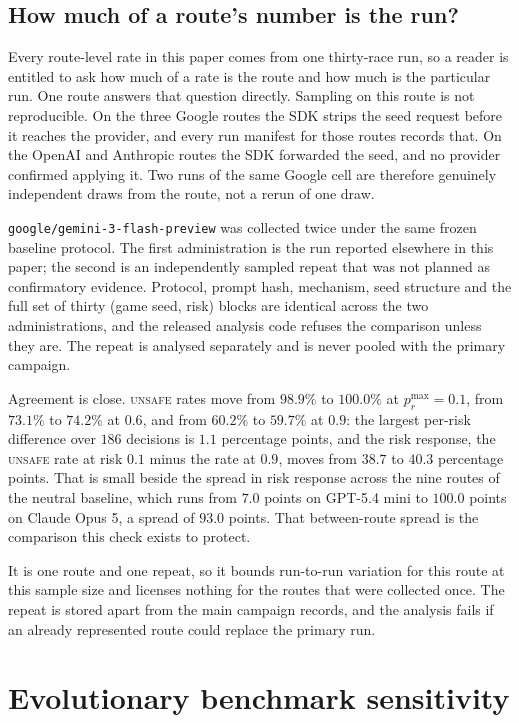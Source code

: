 \documentclass[sigconf,anonymous]{aamas}
\newcommand{\Unsafe}{\textsc{unsafe}}
\begin{document}
\subsection{How much of a route's number is the run?}
\label{app:baseline-replication}

Every route-level rate in this paper comes from one thirty-race run, so a
reader is entitled to ask how much of a rate is the route and how much is the
particular run. One route answers that question directly. Sampling on this
route is not reproducible. On the three Google routes the SDK strips the seed
request before it reaches the provider, and every run manifest for those
routes records that. On the OpenAI and Anthropic routes the SDK forwarded the
seed, and no provider confirmed applying it. Two runs of the same Google cell
are therefore genuinely independent draws from the route, not a rerun of one
draw.

\texttt{google/gemini-3-flash-preview} was collected twice under the same
frozen baseline protocol. The first administration is the run reported
elsewhere in this paper; the second is an independently sampled repeat that was
not planned as confirmatory evidence. Protocol, prompt hash, mechanism, seed
structure and the full set of thirty (game seed, risk) blocks are identical
across the two administrations, and the released analysis code refuses the
comparison unless they are. The repeat is analysed separately and is never
pooled with the primary campaign.

Agreement is close. \Unsafe{} rates move from $98.9\%$ to $100.0\%$ at
$p_r^{\max}=0.1$, from $73.1\%$ to $74.2\%$ at $0.6$, and from $60.2\%$ to
$59.7\%$ at $0.9$: the largest per-risk difference over $186$ decisions is
$1.1$ percentage points, and the risk response, the \Unsafe{} rate at risk
$0.1$ minus the rate at $0.9$, moves from $38.7$ to $40.3$ percentage points.
That is small beside the spread in risk response across the nine routes of the
neutral baseline, which runs from $7.0$ points on GPT-5.4 mini to $100.0$
points on Claude Opus 5, a spread of $93.0$ points. That between-route spread
is the comparison this check exists to protect.

It is one route and one repeat, so it bounds run-to-run variation for this
route at this sample size and licenses nothing for the routes that were
collected once. The repeat is stored apart from the main campaign records, and
the analysis fails if an already represented route could replace the primary
run.

\section{Evolutionary benchmark sensitivity}
\end{document}
